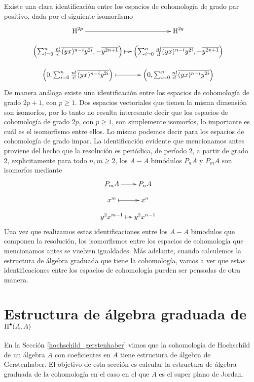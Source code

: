 \documentclass[fleqn,../tesis.tex]{subfiles}
\begin{document}
Existe una clara identificación entre los espacios de cohomología de grado par positivo, dada por
el siguiente isomorfismo
\begin{align*}
	\xymatrix@=1em{
		\Hy^{2p} \ar[r] & \Hy^{2q}\\
		\left(\sum_{i = 0}^n\frac{n!}{i!}\ov{(yx)^{n - i}y^{2i}}, -\ov{y^{2n + 1}}\right) \ar@{|->}[r] &
			\left(\sum_{i = 0}^n\frac{n!}{i!}\ov{(yx)^{n - i}y^{2i}}, -\ov{y^{2n + 1}}\right)\\
		\left(0, \sum_{i = 0}^n\frac{n!}{i!}\ov{(yx)^{n - i}y^{2i}}\right)\ar@{|->}[r] &
			\left(0, \sum_{i = 0}^n\frac{n!}{i!}\ov{(yx)^{n - i}y^{2i}}\right)
	}
\end{align*}
De manera análoga existe una identificación entre los espacios de cohomología de grado $2p + 1$, con $p\geq 1$.
Dos espacios vectoriales que tienen la misma dimensión son isomorfos, por lo tanto no resulta interesante
decir que los espacios de cohomología de grado $2p$, con $p \geq 1$, son simplemente isomorfos, lo importante
es cuál es el isomorfismo entre ellos. Lo mismo podemos decir para los espacios de cohomología de grado impar. La identificación evidente que mencionamos antes proviene del hecho que la resolución es periódica, de período 2, a partir de grado 2, explicitamente
para todo $n, m \geq 2$, los $A-A$ bimódulos $P_{n}A$ y $P_{m}A$ son isomorfos mediante
\begin{align*}
 \xymatrix@=1em{
	 P_{m}A \ar[r] & P_{n}A\\
	 x^{m} \ar@{|->}[r] & x^{n}\\
	 y^2x^{m - 1} \ar@{|->}[r] & y^2x^{n - 1}\\
 }
\end{align*}
Una vez que realizamos estas identificaciones entre los $A-A$ bimodulos que componen la resolución, los isomorfismos entre
los espacios de cohomología que mencionamos antes se vuelven igualdades. Más adelante, cuando calculemos la estructura
de álgebra graduada que tiene la cohomología, vamos a ver que estas identificaciones entre los espacios de cohomología
pueden ser pensadas de otra manera.
\section{Estructura de álgebra graduada de $\operatorname{H}^{\bullet}(A, A)$}
En la Sección \ref{hochschild_gerstenhaber} vimos que la cohomología de Hochschild de un álgebra $A$ con
coeficientes en $A$ tiene estructura de álgebra de Gerstenhaber. El objetivo de esta
sección es calcular la estructura de álgebra graduada de la cohomología en el caso en el que $A$ es el 
super plano de Jordan.
\end{document}
